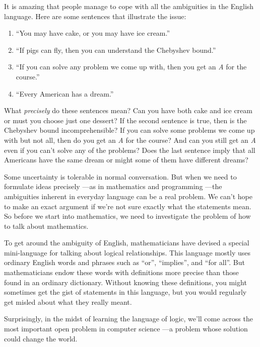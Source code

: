
It is amazing that people manage to cope with all the ambiguities in the
English language.  Here are some sentences that illustrate the issue:
%
\begin{enumerate}
\item ``You may have cake, or you may have ice cream.''
\item ``If pigs can fly, then you can understand the Chebyshev bound.''
\item ``If you can solve any problem we come up with, then you get an
  \emph{A} for the course.''
\item ``Every American has a dream.''
\end{enumerate}
%
What \textit{precisely} do these sentences mean?  Can you have both cake
and ice cream or must you choose just one dessert?  If the second sentence
is true, then is the Chebyshev bound incomprehensible?  If you can solve
some problems we come up with but not all, then do you get an \emph{A} for
the course?  And can you still get an \emph{A} even if you can't solve any
of the problems?  Does the last sentence imply that all Americans have the
same dream or might some of them have different dreams?

Some uncertainty is tolerable in normal conversation.  But when we need to
formulate ideas precisely ---as in mathematics and programming ---the
ambiguities inherent in everyday language can be a real problem.  We can't
hope to make an exact argument if we're not sure exactly what the
statements mean.  So before we start into mathematics, we need to
investigate the problem of how to talk about mathematics.

To get around the ambiguity of English, mathematicians have devised a
special mini-language for talking about logical relationships.  This
language mostly uses ordinary English words and phrases such as ``or'',
``implies'', and ``for all''.  But mathematicians endow these words with
definitions more precise than those found in an ordinary dictionary.
Without knowing these definitions, you might sometimes get the gist of
statements in this language, but you would regularly get misled about what
they really meant.

Surprisingly, in the midst of learning the language of logic, we'll
come across the most important open problem in computer science ---a
problem whose solution could change the world.

